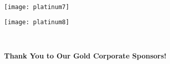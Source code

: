 \documentclass[twoside]{article}
\begin{document}
\begin{center}
        \\
            \begin{minipage}{0.45\textwidth}\begin{center}\vfill\begin{adjustbox}{max size={!}{0.175\textheight}}\texttt{[image: platinum7]}\end{adjustbox}\vfill\end{center}\end{minipage}
        \hspace{2em}\begin{minipage}{0.45\textwidth}\begin{center}\vfill\begin{adjustbox}{max size={!}{0.175\textheight}}\texttt{[image: platinum8]}\end{adjustbox}\vfill\end{center}\end{minipage}
        \\
            \end{center}
    { \fontsize{16}{19}\selectfont \bf Thank You to Our Gold Corporate Sponsors!}
\end{document}
